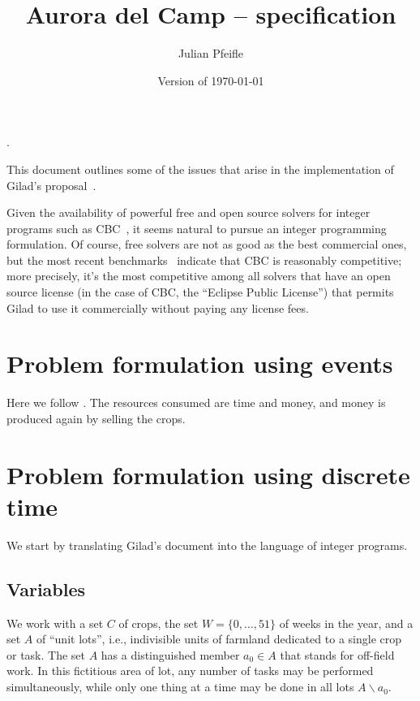 \documentclass[11pt]{amsart}
\numberwithin{equation}{section}
\begin{document}
\renewcommand*\descriptionlabel[1]{%
\hspace\labelsep\normalfont\itshape #1:}.

\title{Aurora del Camp -- specification}
\author{Julian Pfeifle}
\date{Version of \today}
\maketitle

This document outlines some of the issues that arise in the
implementation of Gilad's proposal~\cite{buzi11}.

\medskip
Given the availability of powerful free and open source solvers for
integer programs such as CBC~\cite{cbc}, it seems natural to pursue an
integer programming formulation. Of course, free solvers are not as
good as the best commercial ones, but the most recent
benchmarks~\cite{mittelmann11} indicate that CBC is reasonably
competitive; more precisely, it's the most competitive among all
solvers that have an open source license (in the case of CBC, the
``Eclipse Public License'') that permits Gilad to use it commercially
without paying any license fees.

\section{Problem formulation using events}

Here we follow \cite{artigues-etal11}. The resources consumed are time
and money, and money is produced again by selling the crops.

\section{Problem formulation using discrete time}

We start by translating Gilad's document into the language of integer
programs. %
  
\subsection{Variables}

We work with a set $C$ of crops, the set $W=\{0,\dots,51\}$ of weeks
in the year, and a set $A$ of ``unit lots'', i.e., indivisible units
of farmland dedicated to a single crop or task. The set $A$ has a
distinguished member $a_0\in A$ that stands for off-field work. In
this fictitious area of lot, any number of tasks may be performed
simultaneously, while only one thing at a time may be done in all
lots $A\smallsetminus a_0$. 
\end{document}
